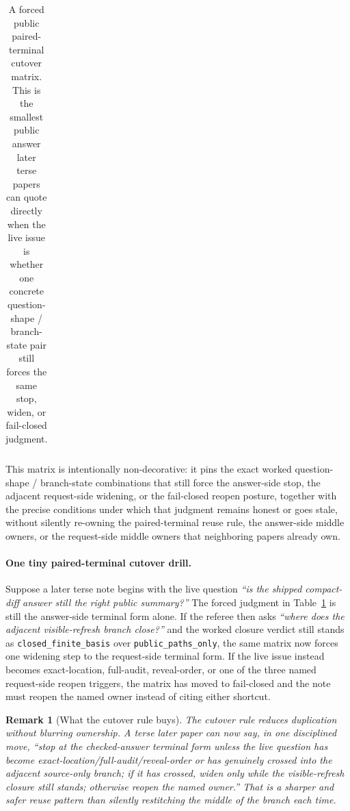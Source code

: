 \documentclass[11pt]{article}
\newtheorem{remark}{Remark}
\begin{document}
\begin{table}[t]
\begin{tabularx}{\linewidth}{@{}lX@{}}
\bottomrule
\end{tabularx}
\caption{A forced public paired-terminal cutover matrix. This is the smallest public answer later terse papers can quote directly when the live issue is whether one concrete question-shape / branch-state pair still forces the same stop, widen, or fail-closed judgment.}
\label{tab:forced-public-paired-terminal-cutover-matrix}
\end{table}

This matrix is intentionally non-decorative: it pins the exact worked question-shape / branch-state combinations that still force the answer-side stop, the adjacent request-side widening, or the fail-closed reopen posture, together with the precise conditions under which that judgment remains honest or goes stale, without silently re-owning the paired-terminal reuse rule, the answer-side middle owners, or the request-side middle owners that neighboring papers already own.\cite{series:workedexample}

\paragraph{One tiny paired-terminal cutover drill.}
Suppose a later terse note begins with the live question \emph{``is the shipped compact-diff answer still the right public summary?''} The forced judgment in Table~\ref{tab:forced-public-paired-terminal-cutover-matrix} is still the answer-side terminal form alone. If the referee then asks \emph{``where does the adjacent visible-refresh branch close?''} and the worked closure verdict still stands as \nolinkurl{closed_finite_basis} over \nolinkurl{public_paths_only}, the same matrix now forces one widening step to the request-side terminal form. If the live issue instead becomes exact-location, full-audit, reveal-order, or one of the three named request-side reopen triggers, the matrix has moved to fail-closed and the note must reopen the named owner instead of citing either shortcut.

\begin{remark}[What the cutover rule buys]
The cutover rule reduces duplication without blurring ownership.
A terse later paper can now say, in one disciplined move, ``stop at the checked-answer terminal form unless the live question has become exact-location/full-audit/reveal-order or has genuinely crossed into the adjacent source-only branch; if it has crossed, widen only while the visible-refresh closure still stands; otherwise reopen the named owner.''
That is a sharper and safer reuse pattern than silently restitching the middle of the branch each time.
\end{remark}
\end{document}
